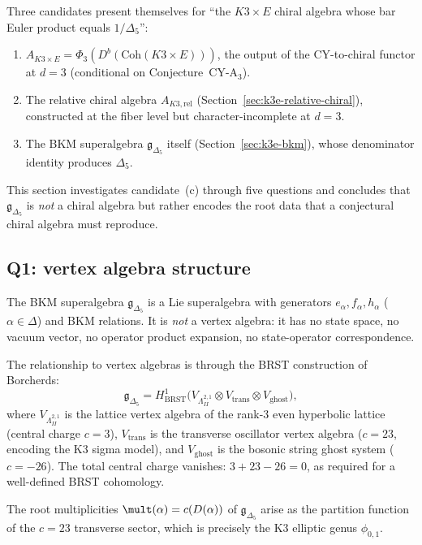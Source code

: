 Three candidates present themselves for ``the $K3 \times E$ chiral algebra whose bar Euler product equals $1/\Delta_5$'':
\begin{enumerate}[label=(\alph*)]
\item $A_{K3 \times E} = \Phi_3(D^b(\mathrm{Coh}(K3 \times E)))$, the output of the CY-to-chiral functor at $d = 3$ (conditional on Conjecture~CY-A$_3$).
\item The relative chiral algebra $A_{K3,\mathrm{rel}}$ (Section~\ref{sec:k3e-relative-chiral}), constructed at the fiber level but character-incomplete at $d = 3$.
\item The BKM superalgebra $\mathfrak{g}_{\Delta_5}$ itself (Section~\ref{sec:k3e-bkm}), whose denominator identity produces $\Delta_5$.
\end{enumerate}
This section investigates candidate~(c) through five questions and concludes that $\mathfrak{g}_{\Delta_5}$ is \emph{not} a chiral algebra but rather encodes the root data that a conjectural chiral algebra must reproduce.

\subsection{Q1: vertex algebra structure}
\label{subsec:k3e-bkm-q1}

The BKM superalgebra $\mathfrak{g}_{\Delta_5}$ is a Lie superalgebra with generators $e_\alpha, f_\alpha, h_\alpha$ ($\alpha \in \Delta$) and BKM relations. It is \emph{not} a vertex algebra: it has no state space, no vacuum vector, no operator product expansion, no state-operator correspondence.

The relationship to vertex algebras is through the BRST construction of Borcherds:
\begin{equation}
\label{eq:bkm-brst}
 \mathfrak{g}_{\Delta_5} = H^1_{\mathrm{BRST}}\bigl(V_{\Lambda^{2,1}_{II}} \otimes V_{\mathrm{trans}} \otimes V_{\mathrm{ghost}}\bigr),
\end{equation}
where $V_{\Lambda^{2,1}_{II}}$ is the lattice vertex algebra of the rank-$3$ even hyperbolic lattice (central charge $c = 3$), $V_{\mathrm{trans}}$ is the transverse oscillator vertex algebra ($c = 23$, encoding the K3 sigma model), and $V_{\mathrm{ghost}}$ is the bosonic string ghost system ($c = -26$). The total central charge vanishes: $3 + 23 - 26 = 0$, as required for a well-defined BRST cohomology.

The root multiplicities $\mult(\alpha) = c(D(\alpha))$ of $\mathfrak{g}_{\Delta_5}$ arise as the partition function of the $c = 23$ transverse sector, which is precisely the K3 elliptic genus $\phi_{0,1}$.


